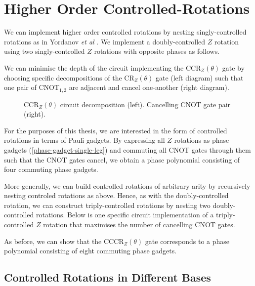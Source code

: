 \section{Higher Order Controlled-Rotations}

We can implement higher order controlled rotations by nesting singly-controlled rotations as in Yordanov \textit{et al} \cite{Yordanov2020}. We implement a doubly-controlled $Z$ rotation using two singly-controlled $Z$ rotations with opposite phases as follows.


We can minimise the depth of the circuit implementing the CCR$_Z(\theta)$ gate by choosing specific decompositions of the CR$_Z(\theta)$ gate (left diagram) such that one pair of $\text{CNOT}_{1, 2}$ are adjacent and cancel one-another (right diagram).

\begin{figure}[H]
    \centering
    \caption{CCR$_Z(\theta)$ circuit decomposition (left). Cancelling CNOT gate pair (right).}
\end{figure}

For the purposes of this thesis, we are interested in the form of controlled rotations in terms of Pauli gadgets. By expressing all $Z$ rotations as phase gadgets (\ref{phase-gadget-single-leg}) and commuting all CNOT gates through them such that the CNOT gates cancel, we obtain a phase polynomial consisting of four commuting phase gadgets.


More generally, we can build controlled rotations of arbitrary arity by recursively nesting controled rotations as above. Hence, as with the doubly-controlled rotation, we can construct triply-controlled rotations by nesting two doubly-controlled rotations. Below is one specific circuit implementation of a triply-controlled $Z$ rotation that maximises the number of cancelling CNOT gates.


As before, we can show that the CCCR$_Z(\theta)$ gate corresponds to a phase polynomial consisting of eight commuting phase gadgets.


\subsection{Controlled Rotations in Different Bases}

